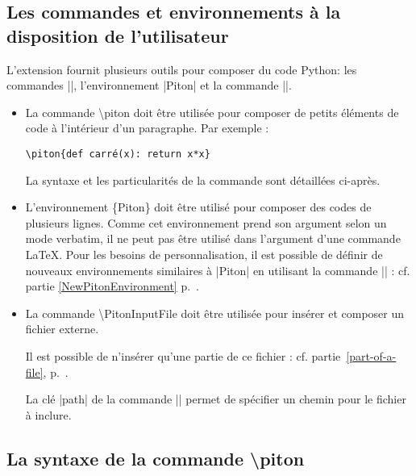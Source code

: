 \documentclass[dvipsnames,svgnames]{article}
\begin{document}
\subsection{Les commandes et environnements à la disposition de l'utilisateur}


L'extension  fournit plusieurs outils pour composer du code Python: les commandes |\piton|,
l'environnement |{Piton}| et la commande |\PitonInputFile|. 

\begin{itemize} \setlength{\fboxsep}{1pt}
\item La commande \colorbox{gray!20}{\ttfamily \textbackslash piton} doit être utilisée pour composer de petits éléments de code à l'intérieur d'un
paragraphe. Par exemple : 

{\color{gray}\verb|\piton{def carré(x): return x*x}|}\qquad 
{}

La syntaxe et les particularités de la commande sont détaillées ci-après.


\item L'environnement \colorbox{gray!20}{\ttfamily \{Piton\}} doit être utilisé pour composer des codes de
plusieurs lignes. Comme cet environnement prend son argument selon un mode verbatim, il ne peut pas être utilisé
dans l'argument d'une commande LaTeX. Pour les besoins de personnalisation, il est possible de définir de nouveaux
environnements similaires à |{Piton}| en utilisant la commande |\NewPitonEnvironment| : cf. partie
\ref{NewPitonEnvironment} p.~\pageref{NewPitonEnvironment}.

\item La commande \colorbox{gray!20}{\ttfamily \textbackslash PitonInputFile} doit être utilisée pour insérer et
composer un fichier externe.

Il est possible de n'insérer qu'une partie de ce fichier : cf. partie~\ref{part-of-a-file},
p.~\pageref{part-of-a-file}.

La clé |path| de la commande |\PitonOptions| permet de spécifier un chemin pour le fichier à inclure. 
\end{itemize}


\subsection{La syntaxe de la commande \textbackslash piton}

\end{document}
